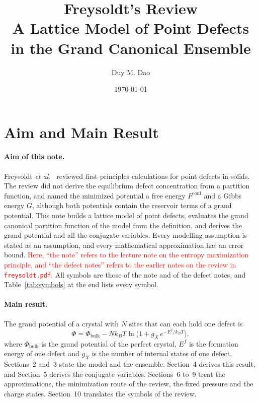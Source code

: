 \documentclass[11pt]{article}      %
\title{Freysoldt's Review\\[6pt]
\large A Lattice Model of Point Defects in the Grand Canonical Ensemble}
\author{Duy M. Dao}
\date{\today}                      %
\numberwithin{equation}{section}   %
\begin{document}
\maketitle                         %

\section{Aim and Main Result}

\paragraph{Aim of this note.}
Freysoldt \textit{et al.}~\cite{freysoldt} reviewed first-principles
calculations for point defects in solids. The review did not derive the
equilibrium defect concentration from a partition function, and named the
minimized potential a free energy $F^{\text{conf}}$ and a Gibbs energy $G$,
although both potentials contain the reservoir terms of a grand potential.
This note builds a lattice model of point defects, evaluates the grand
canonical partition function of the model from the definition, and derives
the grand potential and all the conjugate variables. Every modelling
assumption is stated as an assumption, and every mathematical approximation
has an error bound. \textcolor{red}{Here, ``the note'' refers to the lecture
note on the entropy maximization principle, and ``the defect notes'' refers
to the earlier notes on the review in \texttt{freysoldt.pdf}.} All symbols
are those of the note and of the defect notes, and Table~\ref{tab:symbols}
at the end lists every symbol.

\paragraph{Main result.}
The grand potential of a crystal with $N$ sites that can each hold one
defect is
\begin{equation*}
    \Phi=\Phi_{\text{bulk}}
    -Nk_BT\ln\!\Big(1+g_X\,e^{-E^f/k_BT}\Big),
\end{equation*}
where $\Phi_{\text{bulk}}$ is the grand potential of the perfect crystal,
$E^f$ is the formation energy of one defect and $g_X$ is the number of
internal states of one defect. Sections~2 and~3 state the model and the
ensemble. Section~4 derives this result, and Section~5 derives the
conjugate variables. Sections~6 to~9 treat the approximations, the
minimization route of the review, the fixed pressure and the charge states.
Section~10 translates the symbols of the review.
\end{document}
